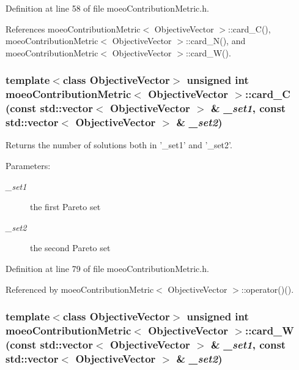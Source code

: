 Definition at line 58 of file moeo\-Contribution\-Metric.h.

References moeo\-Contribution\-Metric$<$ Objective\-Vector $>$::card\_\-C(), moeo\-Contribution\-Metric$<$ Objective\-Vector $>$::card\_\-N(), and moeo\-Contribution\-Metric$<$ Objective\-Vector $>$::card\_\-W().
\subsubsection{\setlength{\rightskip}{0pt plus 5cm}template$<$class Objective\-Vector$>$ unsigned int \bf{moeo\-Contribution\-Metric}$<$ Objective\-Vector $>$::card\_\-C (const std::vector$<$ Objective\-Vector $>$ \& {\em \_\-set1}, const std::vector$<$ Objective\-Vector $>$ \& {\em \_\-set2})\hspace{0.3cm}{\tt  [inline, private]}}\label{classmoeoContributionMetric_4e60849763aaad0cdea66e71edf2d29e}


Returns the number of solutions both in '\_\-set1' and '\_\-set2'. 

\begin{Desc}
\item[Parameters:]
\begin{description}
\item[{\em \_\-set1}]the first Pareto set \item[{\em \_\-set2}]the second Pareto set \end{description}
\end{Desc}


Definition at line 79 of file moeo\-Contribution\-Metric.h.

Referenced by moeo\-Contribution\-Metric$<$ Objective\-Vector $>$::operator()().
\subsubsection{\setlength{\rightskip}{0pt plus 5cm}template$<$class Objective\-Vector$>$ unsigned int \bf{moeo\-Contribution\-Metric}$<$ Objective\-Vector $>$::card\_\-W (const std::vector$<$ Objective\-Vector $>$ \& {\em \_\-set1}, const std::vector$<$ Objective\-Vector $>$ \& {\em \_\-set2})\hspace{0.3cm}{\tt  [inline, private]}}\label{classmoeoContributionMetric_68d6d1ec1ed0bed1ea290cdacb93b5b2}


